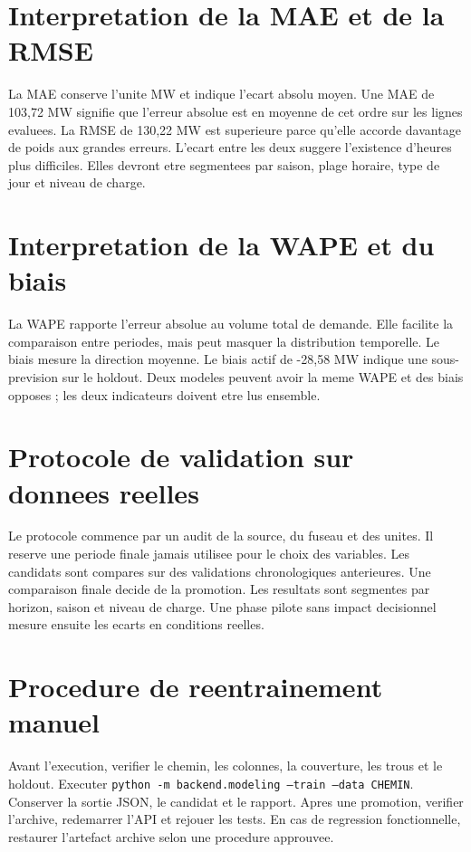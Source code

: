\clearpage
\section{Interpretation de la MAE et de la RMSE}
La MAE conserve l'unite MW et indique l'ecart absolu moyen. Une MAE de 103,72 MW signifie que l'erreur absolue est en moyenne de cet ordre sur les lignes evaluees. La RMSE de 130,22 MW est superieure parce qu'elle accorde davantage de poids aux grandes erreurs. L'ecart entre les deux suggere l'existence d'heures plus difficiles. Elles devront etre segmentees par saison, plage horaire, type de jour et niveau de charge.

\clearpage
\section{Interpretation de la WAPE et du biais}
La WAPE rapporte l'erreur absolue au volume total de demande. Elle facilite la comparaison entre periodes, mais peut masquer la distribution temporelle. Le biais mesure la direction moyenne. Le biais actif de -28,58 MW indique une sous-prevision sur le holdout. Deux modeles peuvent avoir la meme WAPE et des biais opposes ; les deux indicateurs doivent etre lus ensemble.

\clearpage
\section{Protocole de validation sur donnees reelles}
Le protocole commence par un audit de la source, du fuseau et des unites. Il reserve une periode finale jamais utilisee pour le choix des variables. Les candidats sont compares sur des validations chronologiques anterieures. Une comparaison finale decide de la promotion. Les resultats sont segmentes par horizon, saison et niveau de charge. Une phase pilote sans impact decisionnel mesure ensuite les ecarts en conditions reelles.

\clearpage
\section{Procedure de reentrainement manuel}
Avant l'execution, verifier le chemin, les colonnes, la couverture, les trous et le holdout. Executer \texttt{python -m backend.modeling --train --data CHEMIN}. Conserver la sortie JSON, le candidat et le rapport. Apres une promotion, verifier l'archive, redemarrer l'API et rejouer les tests. En cas de regression fonctionnelle, restaurer l'artefact archive selon une procedure approuvee.

